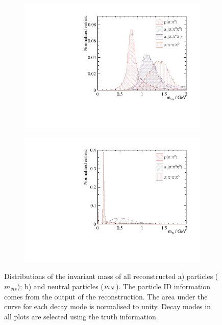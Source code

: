 \begin{figure}[htbp]
\centering
\begin{subfigure}[b]{0.45\textwidth}
 \includegraphics[width=\textwidth]{tau/var2/mVis_100GeV_improved_zoom.pdf}
  \caption{}
  \label{fig:tauVarMVis}
\end{subfigure}
\begin{subfigure}[b]{0.45\textwidth}
 \includegraphics[width=\textwidth]{tau/mNeutral_100GeV_improved_zoom.pdf}
  \caption{}
  \label{fig:tauVarMNeutral}
\end{subfigure}
\caption
{Distributions of  the invariant mass of all reconstructed a) particles (${m}_{vis}$); b) and neutral particles (${m}_{N}$). The particle ID information comes from the output of the \pandora reconstruction. The area under the curve for each decay mode is normalised to unity. Decay modes in all plots are selected using the truth information.}
\label{fig:tauVar2}
\end{figure}

